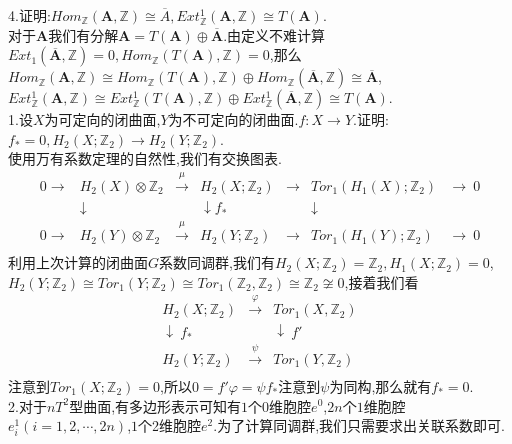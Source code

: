 \documentclass[b5paper]{ctexart}
\begin{document}
4.证明:$Hom_{\mathbb{Z}}(\mathbf{A},\mathbb{Z})\cong \overline{A},Ext_{\mathbb{Z}}^1(\mathbf{A},\mathbb{Z})\cong T(\mathbf{A})$.\\
对于$\mathbf{A}$我们有分解$\mathbf{A}=T(\mathbf{A})\oplus\overline{\mathbf{A}}$.由定义不难计算$Ext_1(\overline{\mathbf{A}},\mathbb{Z})=0,Hom_{\mathbb{Z}}(T\mathbf{(A)},\mathbb{Z})=0$,那么$Hom_{\mathbb{Z}}(\mathbf{A},\mathbb{Z})\cong Hom_{\mathbb{Z}}(T(\mathbf{A}),\mathbb{Z})\oplus Hom_{\mathbb{Z}}(\overline{\mathbf{A}},\mathbb{Z})\cong \overline{\mathbf{A}}$,\\
$Ext^1_{\mathbb{Z}}(\mathbf{A},\mathbb{Z})\cong Ext^1_{\mathbb{Z}}(T(\mathbf{A}),\mathbb{Z})\oplus Ext^1_{\mathbb{Z}}(\overline{\mathbf{A}},\mathbb{Z})\cong T(\mathbf{A}).$\\
1.设$X$为可定向的闭曲面,$Y$为不可定向的闭曲面.$f:X\rightarrow Y$.证明:$f_*=0,H_2(X;\mathbb{Z}_2)\rightarrow H_2(Y;\mathbb{Z}_2)$.\\
使用万有系数定理的自然性,我们有交换图表.\\
\[\begin{array}{ccccccc}
0  \rightarrow & H_2(X)\otimes \mathbb{Z}_2& \xrightarrow{\mu}& H_2(X;\mathbb{Z}_2)& \rightarrow & Tor_1(H_1(X);\mathbb{Z}_2)&\rightarrow ~0\\
               &\downarrow          &                  &\downarrow f_*&             &\downarrow       \\
0  \rightarrow & H_2(Y)\otimes \mathbb{Z}_2& \xrightarrow{\mu}& H_2(Y;\mathbb{Z}_2)& \rightarrow & Tor_1(H_1(Y);\mathbb{Z}_2)&\rightarrow ~0\\
\end{array}
\]
利用上次计算的闭曲面$G$系数同调群,我们有$H_2(X;\mathbb{Z}_2)=\mathbb{Z}_2,H_1(X;\mathbb{Z}_2)=0$,\\
$H_2(Y;\mathbb{Z}_2)\cong
Tor_1(Y;\mathbb{Z}_2)\cong
Tor_1(\mathbb{Z}_2,\mathbb{Z}_2)\cong \mathbb{Z}_2\not\cong 0$,接着我们看
\[\begin{array}{ccc}
H_2(X;\mathbb{Z}_2)&\xrightarrow{\varphi} & Tor_1(X,\mathbb{Z}_2)\\
\downarrow~f_*& &\downarrow~f'\\
H_2(Y;\mathbb{Z}_2)&\xrightarrow{\psi} & Tor_1(Y,\mathbb{Z}_2)\\
\end{array}
\]
注意到$Tor_1(X;\mathbb{Z}_2)=0$,所以$0=f'\varphi=\psi f_*$注意到$\psi$为同构,那么就有$f_*=0$.\\
2.对于$nT^2$型曲面,有多边形表示可知有$1$个$0$维胞腔$e^0$,$2n$个$1$维胞腔$e^1_i(i=1,2,\cdots,2n)$,$1$个2维胞腔$e^2$.为了计算同调群,我们只需要求出关联系数即可.
\end{document}
